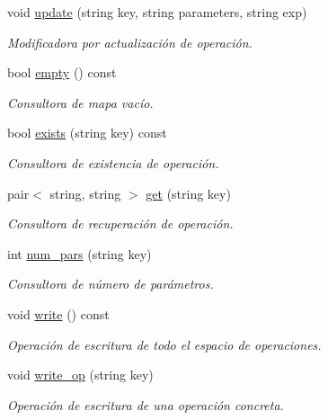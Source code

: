 \begin{DoxyCompactItemize}
void \hyperlink{class_operation_space_a667ee210b029e32ce7e4ab1139a54087}{update} (string key, string parameters, string exp)
\begin{DoxyCompactList}\small\item\em Modificadora por actualización de operación. \end{DoxyCompactList}\item 
bool \hyperlink{class_operation_space_abdb93147a79f23d909c896a339371e00}{empty} () const 
\begin{DoxyCompactList}\small\item\em Consultora de mapa vacío. \end{DoxyCompactList}\item 
bool \hyperlink{class_operation_space_a860a20e7ef047fe60690deb1c155e68a}{exists} (string key) const 
\begin{DoxyCompactList}\small\item\em Consultora de existencia de operación. \end{DoxyCompactList}\item 
pair$<$ string, string $>$ \hyperlink{class_operation_space_af2bcc0acd07952fa40e2cce5dec8c235}{get} (string key)
\begin{DoxyCompactList}\small\item\em Consultora de recuperación de operación. \end{DoxyCompactList}\item 
int \hyperlink{class_operation_space_a21c12c42dc3204e985a5bbe53ef17c4b}{num\+\_\+pars} (string key)
\begin{DoxyCompactList}\small\item\em Consultora de número de parámetros. \end{DoxyCompactList}\item 
void \hyperlink{class_operation_space_a20984ed564af09da9402980310f538c9}{write} () const 
\begin{DoxyCompactList}\small\item\em Operación de escritura de todo el espacio de operaciones. \end{DoxyCompactList}\item 
void \hyperlink{class_operation_space_af671c739e788c44d4af703d4e0fd2284}{write\+\_\+op} (string key)
\begin{DoxyCompactList}\small\item\em Operación de escritura de una operación concreta. \end{DoxyCompactList}\end{DoxyCompactItemize}


